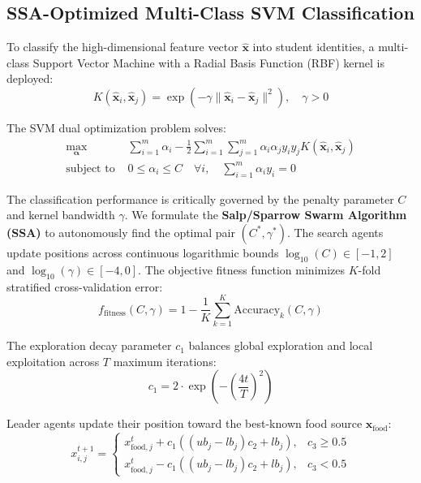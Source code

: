 \documentclass[conference]{IEEEtran}
\begin{document}
\subsection{SSA-Optimized Multi-Class SVM Classification}
To classify the high-dimensional feature vector $\hat{\mathbf{x}}$ into student identities, a multi-class Support Vector Machine with a Radial Basis Function (RBF) kernel is deployed:
\begin{equation}
K(\hat{\mathbf{x}}_i, \hat{\mathbf{x}}_j) = \exp\left(-\gamma \|\hat{\mathbf{x}}_i - \hat{\mathbf{x}}_j\|^2\right), \quad \gamma > 0
\end{equation}

The SVM dual optimization problem solves:
\begin{align}
\max_{\boldsymbol{\alpha}} & \sum_{i=1}^m \alpha_i - \frac{1}{2}\sum_{i=1}^m \sum_{j=1}^m \alpha_i \alpha_j y_i y_j K(\hat{\mathbf{x}}_i, \hat{\mathbf{x}}_j) \\
\text{subject to } & 0 \le \alpha_i \le C \quad \forall i, \quad \sum_{i=1}^m \alpha_i y_i = 0
\end{align}

The classification performance is critically governed by the penalty parameter $C$ and kernel bandwidth $\gamma$. We formulate the \textbf{Salp/Sparrow Swarm Algorithm (SSA)} to autonomously find the optimal pair $(C^*, \gamma^*)$. The search agents update positions across continuous logarithmic bounds $\log_{10}(C) \in [-1, 2]$ and $\log_{10}(\gamma) \in [-4, 0]$. The objective fitness function minimizes $K$-fold stratified cross-validation error:
\begin{equation}
f_{\text{fitness}}(C, \gamma) = 1 - \frac{1}{K}\sum_{k=1}^K \text{Accuracy}_k(C, \gamma)
\end{equation}

The exploration decay parameter $c_1$ balances global exploration and local exploitation across $T$ maximum iterations:
\begin{equation}
c_1 = 2 \cdot \exp\left(-\left(\frac{4t}{T}\right)^2\right)
\end{equation}

Leader agents update their position toward the best-known food source $\mathbf{x}_{\text{food}}$:
\begin{equation}
x_{i, j}^{t+1} = \begin{cases} 
x_{\text{food}, j}^t + c_1 \left((ub_j - lb_j)c_2 + lb_j\right), & c_3 \ge 0.5 \\ 
x_{\text{food}, j}^t - c_1 \left((ub_j - lb_j)c_2 + lb_j\right), & c_3 < 0.5 
\end{cases}
\end{equation}
\end{document}
